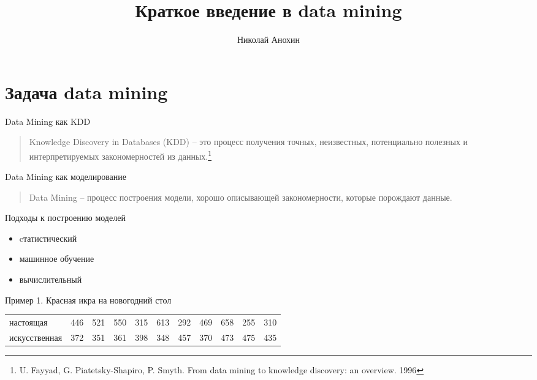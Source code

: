 \documentclass[aspectratio=169]{beamer}
\author{Николай Анохин}
\title{Краткое введение в data mining}
\date{}
\begin{document}
\begin{frame}
\titlepage
\end{frame}

\section{Задача data mining}

\begin{frame}{Data Mining как KDD}

\begin{quote}{Knowledge Discovery in Databases (KDD)}
-- это процесс получения точных, неизвестных, потенциально полезных и интерпретируемых закономерностей из данных.\footnote{U. Fayyad, G. Piatetsky-Shapiro, P. Smyth. From data mining to knowledge discovery: an overview. 1996\vspace{3em}}
\end{quote}

\end{frame}

\begin{frame}{Data Mining как моделирование}

\begin{quote}{Data Mining}
-- процесс построения модели, хорошо описывающей закономерности, которые порождают данные.
\end{quote}

Подходы к построению моделей
\begin{itemize}
\item cтатистический
\item машинное обучение
\item вычислительный
\end{itemize}

\end{frame}

\begin{frame}{Пример 1. Красная икра на новогодний стол}

\vspace{-8em}

\begin{center}
\begin{small}
\begin{tabular}{l | c | c | c | c | c | c | c | c | c | c |}
настоящая & 446 & 521 & 550 & 315 & 613 & 292 & 469 & 658 & 255 & 310 \\
искусственная & 372 & 351 & 361 & 398 & 348 & 457 & 370 & 473 & 475 & 435
\end{tabular}
\end{small}
\end{center}

\end{frame}
\end{document}
